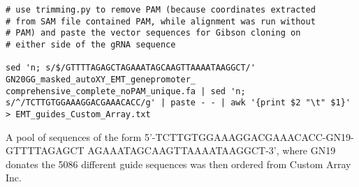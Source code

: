 \begin{small}
\begin{lstlisting}
# use trimming.py to remove PAM (because coordinates extracted 
# from SAM file contained PAM, while alignment was run without 
# PAM) and paste the vector sequences for Gibson cloning on 
# either side of the gRNA sequence

sed 'n; s/$/GTTTTAGAGCTAGAAATAGCAAGTTAAAATAAGGCT/' GN20GG_masked_autoXY_EMT_genepromoter_ comprehensive_complete_noPAM_unique.fa | sed 'n; s/^/TCTTGTGGAAAGGACGAAACACC/g' | paste - - | awk '{print $2 "\t" $1}' > EMT_guides_Custom_Array.txt
\end{lstlisting}\end{small}

A pool of sequences of the form 5'-TCTTGTGGAAAGGACGAAACACC-GN19-GTTTTAGAGCT AGAAATAGCAAGTTAAAATAAGGCT-3', where GN19 donates the 5086 different guide sequences was then ordered from Custom Array Inc. 

